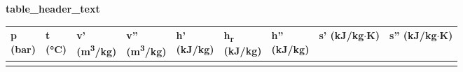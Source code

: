 \begin{center}
    \textbf{ {{ table_header_text }} }
\end{center}
\vspace{0.2cm} %

\begin{longtable}{|>{\raggedleft\arraybackslash}p{1.2cm}|>{\raggedleft\arraybackslash}p{1.5cm}|>{\raggedleft\arraybackslash}p{1.8cm}|>{\raggedleft\arraybackslash}p{1.8cm}|>{\raggedleft\arraybackslash}p{1.5cm}|
>{\raggedleft\arraybackslash}p{1.5cm}|>{\raggedleft\arraybackslash}p{1.5cm}|>{\raggedleft\arraybackslash}p{1.5cm}|>{\raggedleft\arraybackslash}p{1.5cm}|}
\hline
\small \makecell{\textbf{p} \\ (bar)} & \small \makecell{\textbf{t} \\ (°C)} 
& \small \makecell{\textbf{v'} \\ (m\textsuperscript{3}/kg)} & \small \makecell{\textbf{v''} \\ (m\textsuperscript{3}/kg)} 
& \small \makecell{\textbf{h'} \\ (kJ/kg)} & \small \makecell{\textbf{h\textsubscript{r}} \\ (kJ/kg)} & \small \makecell{\textbf{h''} \\ (kJ/kg)} 
& \small \makecell{\textbf{s'} \\ (kJ/kg$\cdot$K)} & \small \makecell{\textbf{s''} \\ (kJ/kg$\cdot$K)} \\
\hline
\endfirsthead

\hline
\hline
\endhead

\hline
\endfoot

\hline
\endlastfoot

{%
{%
{{ item }}{%
{%
{%

\end{longtable}
